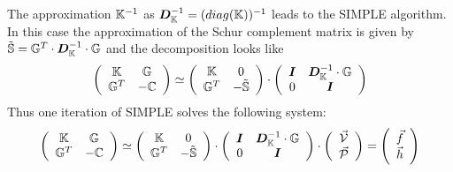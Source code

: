 The approximation ${\mathbb{K}}^{-1}$ as ${\bm D}_{\mathbb{K}}^{-1} = (diag({\mathbb{K}}))^{-1}$ leads to the 
SIMPLE algorithm. In this case the approximation of the Schur complement matrix is given by
$\tilde{{\mathbb{S}}} = {\mathbb{G}}^T\cdot  {\bm D}_{\mathbb{K}}^{-1} \cdot {\mathbb{G}}$  and the decomposition looks like
\[
\left(
\begin{array}{cc}
{\mathbb{K}} & {\mathbb{G}} \\ {\mathbb{G}}^T & -{\mathbb{C}} 
\end{array}
\right)
\simeq
\left(
\begin{array}{cc}
{\mathbb{K}} & 0 \\ 
{\mathbb{G}}^T & -\tilde{{\mathbb{S}}}
\end{array}
\right)
\cdot
\left(
\begin{array}{cc}
{\bm I} & {\bm D}_{\mathbb{K}}^{-1} \cdot {\mathbb{G}} \\
0 & {\bm I} 
\end{array}
\right)
\]
Thus one iteration of SIMPLE solves the following system:
\[
\left(
\begin{array}{cc}
{\mathbb{K}} & {\mathbb{G}} \\ {\mathbb{G}}^T & -{\mathbb{C}} 
\end{array}
\right)
\simeq
\left(
\begin{array}{cc}
{\mathbb{K}} & 0 \\ 
{\mathbb{G}}^T & -\tilde{{\mathbb{S}}}
\end{array}
\right)
\cdot
\left(
\begin{array}{cc}
{\bm I} & {\bm D}_{\mathbb{K}}^{-1} \cdot {\mathbb{G}} \\
0 & {\bm I} 
\end{array}
\right)
\cdot
\left(
\begin{array}{c}
\vec{\cal V} \\ \vec{\cal P}
\end{array}
\right)
=
\left(
\begin{array}{c}
\vec{f} \\ \vec{h}
\end{array}
\right)
\]





